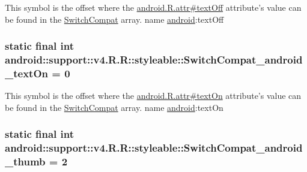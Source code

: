 \label{classandroid_1_1support_1_1v4_1_1_r_1_1styleable_475ea27dd698f2f7fb83ff65423189c3}


This symbol is the offset where the \hyperlink{}{android.R.attr\#textOff} attribute's value can be found in the \hyperlink{classandroid_1_1support_1_1v4_1_1_r_1_1styleable_276d9c1ec80821a3e0fcdaa41daa75a0}{SwitchCompat} array.  name \hyperlink{namespaceandroid}{android}:textOff \hypertarget{classandroid_1_1support_1_1v4_1_1_r_1_1styleable_8198d90992e4ff6dfd99cdd17ff4deef}{
\subsubsection[{SwitchCompat\_\-android\_\-textOn}]{\setlength{\rightskip}{0pt plus 5cm}static final int android::support::v4.R.R::styleable::SwitchCompat\_\-android\_\-textOn = 0}}
\label{classandroid_1_1support_1_1v4_1_1_r_1_1styleable_8198d90992e4ff6dfd99cdd17ff4deef}


This symbol is the offset where the \hyperlink{}{android.R.attr\#textOn} attribute's value can be found in the \hyperlink{classandroid_1_1support_1_1v4_1_1_r_1_1styleable_276d9c1ec80821a3e0fcdaa41daa75a0}{SwitchCompat} array.  name \hyperlink{namespaceandroid}{android}:textOn \hypertarget{classandroid_1_1support_1_1v4_1_1_r_1_1styleable_2499279c732b44c04537677dfc6988b4}{
\subsubsection[{SwitchCompat\_\-android\_\-thumb}]{\setlength{\rightskip}{0pt plus 5cm}static final int android::support::v4.R.R::styleable::SwitchCompat\_\-android\_\-thumb = 2}}
\label{classandroid_1_1support_1_1v4_1_1_r_1_1styleable_2499279c732b44c04537677dfc6988b4}


